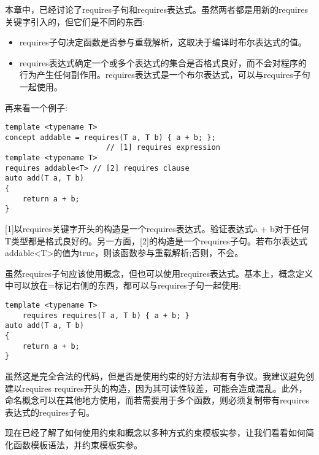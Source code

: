 本章中，已经讨论了requires子句和requires表达式。虽然两者都是用新的requires关键字引入的，但它们是不同的东西:

\begin{itemize}
\item
requires子句决定函数是否参与重载解析，这取决于编译时布尔表达式的值。

\item
requires表达式确定一个或多个表达式的集合是否格式良好，而不会对程序的行为产生任何副作用。requires表达式是一个布尔表达式，可以与requires子句一起使用。
\end{itemize}

再来看一个例子:

\begin{lstlisting}[style=styleCXX]
template <typename T>
concept addable = requires(T a, T b) { a + b; };
                       // [1] requires expression
template <typename T>
requires addable<T> // [2] requires clause
auto add(T a, T b)
{
	return a + b;
}
\end{lstlisting}

[1]以requires关键字开头的构造是一个requires表达式。验证表达式a + b对于任何T类型都是格式良好的。另一方面，[2]的构造是一个requires子句。若布尔表达式addable<T>的值为true，则该函数参与重载解析;否则，不会。

虽然requires子句应该使用概念，但也可以使用requires表达式。基本上，概念定义中可以放在=标记右侧的东西，都可以与requires子句一起使用:

\begin{lstlisting}[style=styleCXX]
template <typename T>
	requires requires(T a, T b) { a + b; }
auto add(T a, T b)
{
	return a + b;
}
\end{lstlisting}

虽然这是完全合法的代码，但是否是使用约束的好方法却有有争议。我建议避免创建以requires requires开头的构造，因为其可读性较差，可能会造成混乱。此外，命名概念可以在其他地方使用，而若需要用于多个函数，则必须复制带有requires表达式的requires子句。

现在已经了解了如何使用约束和概念以多种方式约束模板实参，让我们看看如何简化函数模板语法，并约束模板实参。




































































